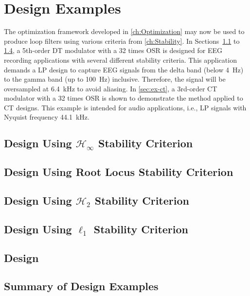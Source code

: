 
\chapter{Design Examples}
\label{ch:Examples}

The optimization framework developed in \autoref{ch:Optimization} may now be used to produce loop filters using various criteria from \autoref{ch:Stability}. In Sections~\ref{sec:ex-hinf} to \ref{sec:ex-l1}, a 5th-order \gls{DT} modulator with a 32 times \gls{OSR} is designed for \gls{EEG} recording applications with several different stability criteria. This application demands a \gls{LP} design to capture \gls{EEG} signals from the delta band (below \SI{4}{\hertz}) to the gamma band (up to \SI{100}{\hertz}) inclusive. Therefore, the signal will be oversampled at \SI{6.4}{\kilo\hertz} to avoid aliasing. In \autoref{sec:ex-ct}, a 3rd-order \gls{CT} modulator with a 32 times \gls{OSR} is shown to demonstrate the method applied to \gls{CT} designs. This example is intended for audio applications, i.e., \gls{LP} signals with Nyquist frequency \SI{44.1}{\kilo\hertz}.


\section{Design Using $\mathcal{H}_\infty$ Stability Criterion}
\label{sec:ex-hinf}

\section{Design Using Root Locus Stability Criterion}
\label{sec:ex-rl}

\section{Design Using $\mathcal{H}_2$ Stability Criterion}
\label{sec:ex-h2}

\section{Design Using $\ell_1$ Stability Criterion}
\label{sec:ex-l1}

\section{ Design}
\label{sec:ex-ct}

\section{Summary of Design Examples}
\label{sec:ex-compare}